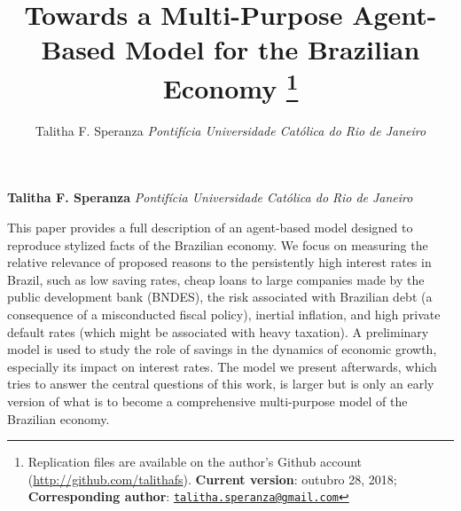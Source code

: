 \documentclass[11pt,]{article}
\title{Towards a Multi-Purpose Agent-Based Model for the Brazilian Economy \thanks{Replication files are available on the author's Github account
(\url{http://github.com/talithafs}). \textbf{Current version}: outubro
28, 2018; \textbf{Corresponding author}:
\href{mailto:talitha.speranza@gmail.com}{\nolinkurl{talitha.speranza@gmail.com}}}  }
\author{\Large Talitha F. Speranza\vspace{0.05in} \newline\normalsize\emph{Pontifícia Universidade Católica do Rio de Janeiro}  }
\date{}
\newcommand*{\authorfont}{\fontfamily{phv}\selectfont}
\renewenvironment{abstract}
 {{%
    \setlength{\leftmargin}{0mm}
    \setlength{\rightmargin}{\leftmargin}%
  }%
  \relax}
 {\endlist}
\begin{document}
	
%

{%
\setlength{\parindent}{0pt}
\thispagestyle{plain}
{\fontsize{18}{20}\selectfont\raggedright 
\maketitle  %

}

{
   \vskip 13.5pt\relax \normalsize\fontsize{11}{12} 
\textbf{\authorfont Talitha F. Speranza} \hskip 15pt \emph{\small Pontifícia Universidade Católica do Rio de Janeiro}   

}

}








\begin{abstract}

    \hbox{\vrule height .2pt width 39.14pc}

    \vskip 8.5pt %

\noindent This paper provides a full description of an agent-based model designed
to reproduce stylized facts of the Brazilian economy. We focus on
measuring the relative relevance of proposed reasons to the persistently
high interest rates in Brazil, such as low saving rates, cheap loans to
large companies made by the public development bank (BNDES), the risk
associated with Brazilian debt (a consequence of a misconducted fiscal
policy), inertial inflation, and high private default rates (which might
be associated with heavy taxation). A preliminary model is used to study
the role of savings in the dynamics of economic growth, especially its
impact on interest rates. The model we present afterwards, which tries
to answer the central questions of this work, is larger but is only an
early version of what is to become a comprehensive multi-purpose model
of the Brazilian economy.


    \hbox{\vrule height .2pt width 39.14pc}


\end{abstract}


\vskip 6.5pt


\noindent  \newpage 
\end{document}
